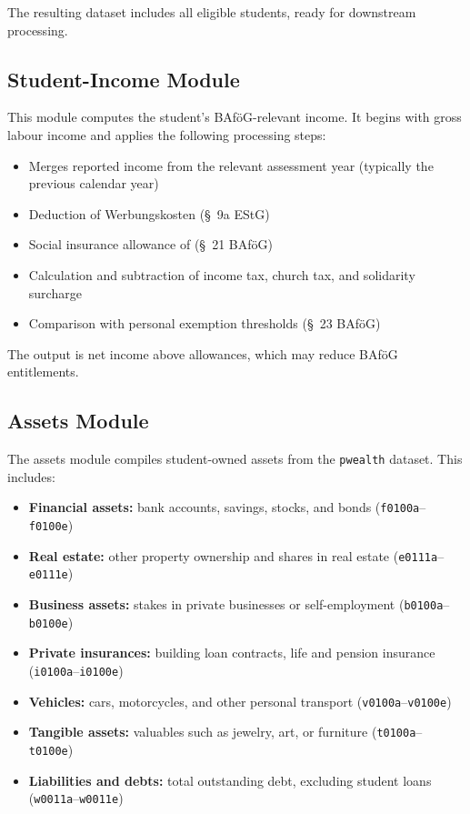 The resulting dataset includes all eligible students, ready for downstream processing.

\subsection{Student-Income Module}

This module computes the student's BAföG-relevant income. It begins with gross labour income and applies the following processing steps:

\begin{itemize}
  \item Merges reported income from the relevant assessment year (typically the previous calendar year)
  \item Deduction of Werbungskosten (§~9a EStG)
  \item Social insurance allowance of (§~21 BAföG)
  \item Calculation and subtraction of income tax, church tax, and solidarity surcharge
  \item Comparison with personal exemption thresholds (§~23 BAföG)
\end{itemize}

The output is net income above allowances, which may reduce BAföG entitlements.

\subsection{Assets Module}

The assets module compiles student-owned assets from the \texttt{pwealth} dataset. This includes:

\begin{itemize}
  \item \textbf{Financial assets:} bank accounts, savings, stocks, and bonds (\texttt{f0100a}--\texttt{f0100e})
  \item \textbf{Real estate:} other property ownership and shares in real estate (\texttt{e0111a}--\texttt{e0111e})
  \item \textbf{Business assets:} stakes in private businesses or self-employment (\texttt{b0100a}--\texttt{b0100e})
  \item \textbf{Private insurances:} building loan contracts, life and pension insurance (\texttt{i0100a}--\texttt{i0100e})
  \item \textbf{Vehicles:} cars, motorcycles, and other personal transport (\texttt{v0100a}--\texttt{v0100e})
  \item \textbf{Tangible assets:} valuables such as jewelry, art, or furniture (\texttt{t0100a}--\texttt{t0100e})
  \item \textbf{Liabilities and debts:} total outstanding debt, excluding student loans (\texttt{w0011a}--\texttt{w0011e})
\end{itemize}

